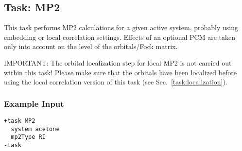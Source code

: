 \subsection{Task: MP2}\label{task: mp2}
\label{sec:MP2}
This task performs MP2 calculations for a given active system, probably using embedding or local correlation
settings. Effects of an optional PCM are taken only into account on the level of the orbitals/Fock matrix.

{\color{red}IMPORTANT:} The orbital localization step for local MP2 is not carried out
within this task! Please make sure that the orbitals have been localized before using the local
correlation version of this task (see Sec.~\ref{task:localization}).
\subsubsection{Example Input}
\begin{lstlisting}
+task MP2
  system acetone
  mp2Type RI
-task
\end{lstlisting}
